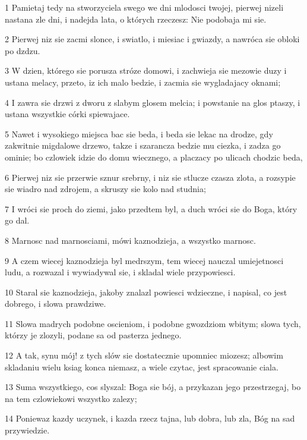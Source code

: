 \par 1 Pamietaj tedy na stworzyciela swego we dni mlodosci twojej, pierwej nizeli nastana zle dni, i nadejda lata, o których rzeczesz: Nie podobaja mi sie.
\par 2 Pierwej niz sie zacmi slonce, i swiatlo, i miesiac i gwiazdy, a nawróca sie obloki po dzdzu.
\par 3 W dzien, którego sie porusza stróze domowi, i zachwieja sie mezowie duzy i ustana melacy, przeto, iz ich malo bedzie, i zacmia sie wygladajacy oknami;
\par 4 I zawra sie drzwi z dworu z slabym glosem melcia; i powstanie na glos ptaszy, i ustana wszystkie córki spiewajace.
\par 5 Nawet i wysokiego miejsca bac sie beda, i beda sie lekac na drodze, gdy zakwitnie migdalowe drzewo, takze i szarancza bedzie mu ciezka, i zadza go ominie; bo czlowiek idzie do domu wiecznego, a placzacy po ulicach chodzic beda,
\par 6 Pierwej niz sie przerwie sznur srebrny, i niz sie stlucze czasza zlota, a rozsypie sie wiadro nad zdrojem, a skruszy sie kolo nad studnia;
\par 7 I wróci sie proch do ziemi, jako przedtem byl, a duch wróci sie do Boga, który go dal.
\par 8 Marnosc nad marnosciami, mówi kaznodzieja, a wszystko marnosc.
\par 9 A czem wiecej kaznodzieja byl medrszym, tem wiecej nauczal umiejetnosci ludu, a rozwazal i wywiadywal sie, i skladal wiele przypowiesci.
\par 10 Staral sie kaznodzieja, jakoby znalazl powiesci wdzieczne, i napisal, co jest dobrego, i slowa prawdziwe.
\par 11 Slowa madrych podobne oscieniom, i podobne gwozdziom wbitym; slowa tych, którzy je zlozyli, podane sa od pasterza jednego.
\par 12 A tak, synu mój! z tych slów sie dostatecznie upomniec miozesz; albowim skladaniu wielu ksiag konca niemasz, a wiele czytac, jest spracowanie ciala.
\par 13 Suma wszystkiego, cos slyszal: Boga sie bój, a przykazan jego przestrzegaj, bo na tem czlowiekowi wszystko zalezy;
\par 14 Poniewaz kazdy uczynek, i kazda rzecz tajna, lub dobra, lub zla, Bóg na sad przywiedzie.


